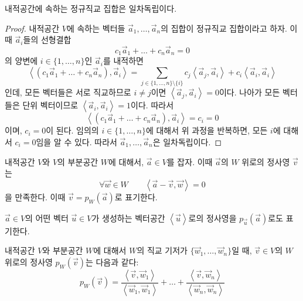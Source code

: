 \documentclass[../engineering_mathematics_lecture_note.tex]{subfiles}
\begin{document}
\begin{theorem}
    내적공간에 속하는 정규직교 집합은 일차독립이다.
\end{theorem}

\begin{proof}
    내적공간 $V$에 속하는 벡터들 $\vec a_1, \dots, \vec a_n$의 집합이 정규직교 집합이라고 하자.
    이때 $\vec a_i$들의 선형결합
    \begin{equation*}
        c_1 \vec a_1 + \dots + c_n \vec a_n = 0
    \end{equation*}
    의 양변에 $i \in \{1, \dots, n\}$인 $\vec a_i$를 내적하면
    \begin{equation*}
        \left<(c_1 \vec a_1 + \dots + c_n \vec a_n), \vec a_i\right> = \sum_{j \in \{1, \dots, n\} \setminus \{i\}} c_j \left<\vec a_j, \vec a_i\right> + c_i \left<\vec a_i, \vec a_i\right>
    \end{equation*}
    인데, 모든 벡터들은 서로 직교하므로 $i \neq j$이면 $\left<\vec a_j, \vec a_i\right> = 0$이다.
    나아가 모든 벡터들은 단위 벡터이므로 $\left<\vec a_i, \vec a_i\right> = 1$이다.
    따라서
    \begin{equation*}
        \left<(c_1 \vec a_1 + \dots + c_n \vec a_n), \vec a_i\right> = c_i = 0
    \end{equation*}
    이며, $c_i = 0$이 된다.
    임의의 $i \in \{1, \dots, n\}$에 대해서 위 과정을 반복하면, 모든 $i$에 대해서 $c_i = 0$임을 알 수 있다.
    따라서 $\vec a_1, \dots, \vec a_n$은 일차독립이다.
\end{proof}

\begin{definition}
    내적공간 $V$와 $V$의 부분공간 $W$에 대해서, $\vec a \in V$를 잡자.
    이때 $\vec a$의 $W$ 위로의 정사영 $\vec v$는 
    \begin{equation*}
        \forall \vec w \in W \qquad \left<\vec a - \vec v, \vec w\right> = 0
    \end{equation*}
    을 만족한다.
    이때 $\vec v = p_W (\vec a)$로 표기한다.

    $\vec a \in V$의 어떤 벡터 $\vec u \in V$가 생성하는 벡터공간 $\left<\vec u\right>$로의 정사영을 $p_{\vec u} (\vec a)$로도 표기한다.
\end{definition}

\begin{theorem}
    내적공간 $V$와 부분공간 $W$에 대해서 $W$의 직교 기저가 $\{\vec w_1, \dots, \vec w_n\}$일 때, $\vec v \in V$의 $W$ 위로의 정사영 $p_W (\vec v)$는 다음과 같다:
    \begin{equation*}
        p_W (\vec v) = \frac{\left<\vec v, \vec w_1\right>}{\left<\vec w_1, \vec w_1\right>} + \dots + \frac{\left<\vec v, \vec w_n\right>}{\left<\vec w_n, \vec w_n\right>}
    \end{equation*}
\end{theorem}
\end{document}
